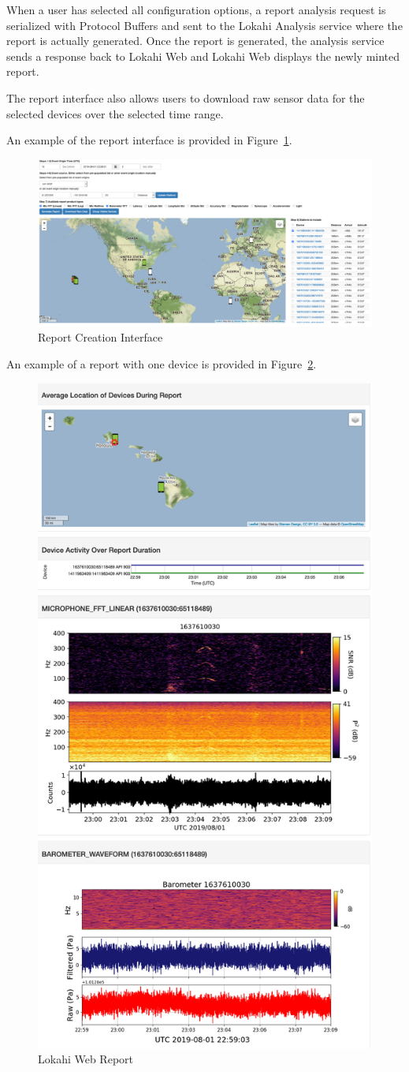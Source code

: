 When a user has selected all configuration options, a report analysis request is serialized with Protocol Buffers and sent to the Lokahi Analysis service where the report is actually generated. Once the report is generated, the analysis service sends a response back to Lokahi Web and Lokahi Web displays the newly minted report.

The report interface also allows users to download raw sensor data for the selected devices over the selected time range.

An example of the report interface is provided in Figure~\ref{fig:lweb_reportcreate}.

\begin{figure}
	\centering
	\includegraphics[width=0.7\linewidth]{figures/lweb_reportcreate.png}
	\caption{Report Creation Interface}
	\label{fig:lweb_reportcreate}
\end{figure}

An example of a report with one device is provided in Figure~\ref{fig:lweb_report}.

\begin{figure}
	\centering
	\includegraphics[width=0.6\linewidth]{figures/lweb_report.png}
	\caption{Lokahi Web Report}
	\label{fig:lweb_report}
\end{figure}


